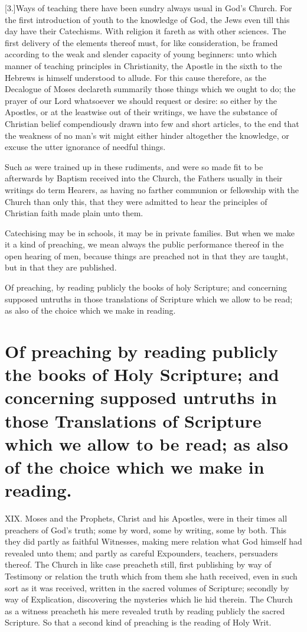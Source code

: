 [3.]Ways of teaching there have been sundry always usual in God’s Church. For the first introduction of youth to the knowledge of God, the Jews even till this day have their Catechisms. With religion it fareth as with other sciences.  The first delivery of the elements thereof must, for like consideration,
 be framed according to the weak and slender capacity of young beginners: unto which manner of teaching principles in Christianity, the Apostle in the sixth to the Hebrews is himself understood to allude. For this cause therefore, as the Decalogue of Moses declareth summarily those things which we ought to do; the prayer of our Lord whatsoever we should request or desire: so either by the Apostles, or at the leastwise out of their writings, we have the substance of Christian belief compendiously drawn into few and short articles, to the end that the weakness of no man’s wit might either hinder altogether the knowledge, or excuse the utter ignorance of needful things.

Such as were trained up in these rudiments, and were so made fit to be afterwards by Baptism received into the Church,  the Fathers usually in their writings do term Hearers,
 as having no farther communion or fellowship with the Church than only this, that they were admitted to hear the principles of Christian faith made plain unto them.

Catechising may be in schools, it may be in private families. But when we make it a kind of preaching, we mean always the public performance thereof in the open hearing of men, because things are preached not in that they are taught, but in that they are published.


Of preaching, by reading publicly the books of holy Scripture; and concerning supposed untruths in those translations of Scripture which we allow to be read; as also of the choice which we make in reading.
\section*{Of preaching by reading publicly the books of Holy Scripture; and concerning supposed untruths in those Translations of Scripture which we allow to be read; as also of the choice which we make in reading.}
XIX. Moses and the Prophets, Christ and his Apostles, were in their times all preachers of God’s truth; some by word, some by writing, some by both. This they did partly as faithful Witnesses, making mere relation what God himself had revealed unto them; and partly as careful Expounders, teachers, persuaders thereof. The Church in like case preacheth still, first publishing by way of Testimony or relation the truth which from them she hath received, even in such sort as it was received, written in the sacred volumes of Scripture; secondly by way of Explication, discovering the mysteries which lie hid therein. The Church as a witness preacheth his mere revealed truth by reading publicly the sacred Scripture. So that a second kind of preaching is the reading of Holy Writ.

